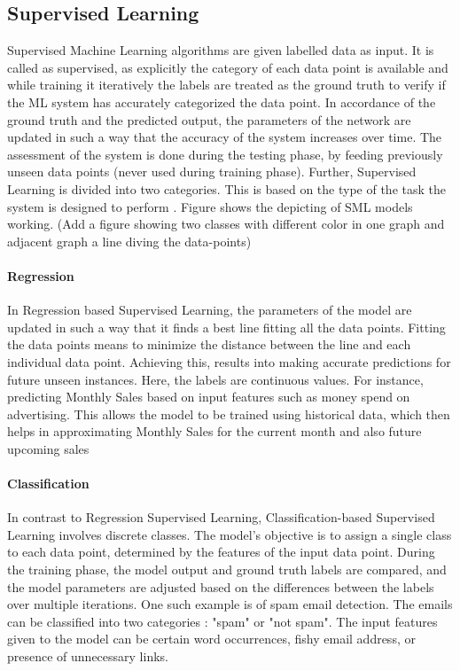 \documentclass[en,]{template/rrlab}
\begin{document}
\subsection{Supervised Learning}
Supervised Machine Learning algorithms are given labelled data as input. It is called as supervised, as explicitly the category of each data point is available and while training it iteratively the labels are treated as the ground truth to verify if the ML system has accurately categorized the data point. In accordance of the ground truth and the predicted output, the parameters of the network are updated in such a way that the accuracy of the system increases over time. The assessment of the system is done during the testing phase, by feeding previously unseen data points (never used during training phase). Further, Supervised Learning is divided into two categories. This is based on the type of the task the system is designed to perform \cite{SML}. Figure shows the depicting of SML models working. (Add a figure showing two classes with different color in one graph and adjacent graph a line diving the data-points)

\paragraph{Regression}
In Regression based Supervised Learning, the parameters of the model are updated in such a way that it finds a best line fitting all the data points. Fitting the data points means to minimize the distance between the line and each individual data point. Achieving this, results into making accurate predictions for future unseen instances. Here, the labels are continuous values. For instance, predicting Monthly Sales based on input features such as money spend on advertising. This allows the model to be trained using historical data, which then helps in approximating Monthly Sales for the current month and also future upcoming sales

\paragraph{Classification}
In contrast to Regression Supervised Learning, Classification-based Supervised Learning involves discrete classes. The model's objective is to assign a single class to each data point, determined by the features of the input data point. During the training phase, the model output and ground truth labels are compared, and the model parameters are adjusted based on the differences between the labels over multiple iterations. One such example is of spam email detection. The emails can be classified into two categories : "spam" or "not spam". The input features given to the model can be certain word occurrences, fishy email address, or presence of unnecessary links.
\end{document}
